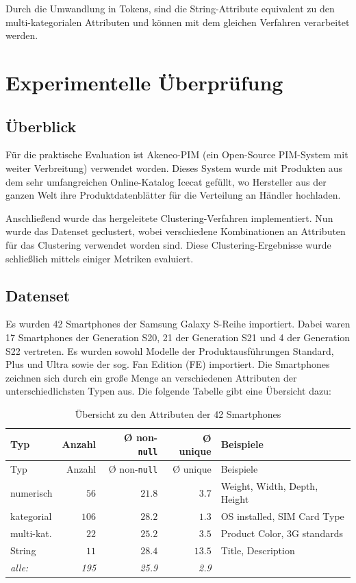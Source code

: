 Durch die Umwandlung in Tokens, sind die String-Attribute equivalent zu
den multi-kategorialen Attributen und können mit dem gleichen Verfahren
verarbeitet werden.

\hypertarget{experimentelle-uxfcberpruxfcfung}{%
\section{Experimentelle
Überprüfung}\label{experimentelle-uxfcberpruxfcfung}}

\hypertarget{uxfcberblick}{%
\subsection{Überblick}\label{uxfcberblick}}

Für die praktische Evaluation ist Akeneo-PIM \autocite{akeneo2022about}
(ein Open-Source PIM-System mit weiter Verbreitung) verwendet worden.
Dieses System wurde mit Produkten aus dem sehr umfangreichen
Online-Katalog Icecat \autocite{icecat2021} gefüllt, wo Hersteller aus
der ganzen Welt ihre Produktdatenblätter für die Verteilung an Händler
hochladen.

Anschließend wurde das hergeleitete Clustering-Verfahren implementiert.
Nun wurde das Datenset geclustert, wobei verschiedene Kombinationen an
Attributen für das Clustering verwendet worden sind. Diese
Clustering-Ergebnisse wurde schließlich mittels einiger Metriken
evaluiert.

\hypertarget{datenset}{%
\subsection{Datenset}\label{datenset}}

Es wurden 42 Smartphones der Samsung Galaxy S-Reihe importiert. Dabei
waren 17 Smartphones der Generation S20, 21 der Generation S21 und 4 der
Generation S22 vertreten. Es wurden sowohl Modelle der
Produktausführungen Standard, Plus und Ultra sowie der sog. Fan Edition
(FE) importiert. Die Smartphones zeichnen sich durch ein große Menge an
verschiedenen Attributen der unterschiedlichsten Typen aus. Die folgende
Tabelle gibt eine Übersicht dazu:

\begin{longtable}[]{@{}lrrrl@{}}
\caption{Übersicht zu den Attributen der 42 Smartphones}\tabularnewline
\toprule()
Typ & Anzahl & Ø non-\texttt{null} & Ø unique & Beispiele \\
\midrule()
\endfirsthead
\toprule()
Typ & Anzahl & Ø non-\texttt{null} & Ø unique & Beispiele \\
\midrule()
\endhead
numerisch & \(56\) & \(21.8\) & \(3.7\) & Weight, Width, Depth,
Height \\
kategorial & \(106\) & \(28.2\) & \(1.3\) & OS installed, SIM Card
Type \\
multi-kat. & \(22\) & \(25.2\) & \(3.5\) & Product Color, 3G
standards \\
String & \(11\) & \(28.4\) & \(13.5\) & Title, Description \\
\emph{alle:} & \emph{195} & \emph{25.9} & \emph{2.9} & \\
\bottomrule()
\end{longtable}

